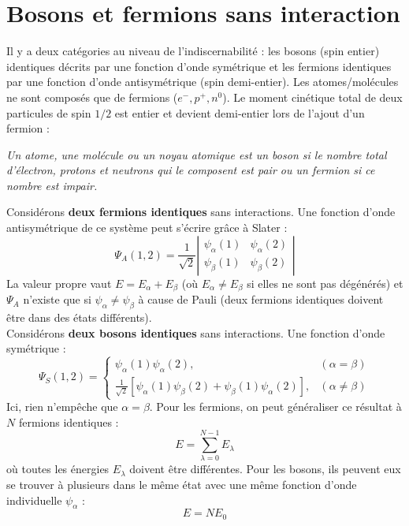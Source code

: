\documentclass[british,french,11pt, a4paper, openany]{book}
\begin{document}
\section{Bosons et fermions sans interaction}
Il y a deux catégories au niveau de l'indiscernabilité : les bosons (spin entier) identiques décrits par 
une fonction d'onde symétrique et les fermions identiques par une fonction d'onde antisymétrique (spin 
demi-entier). Les atomes/molécules ne sont composés que de fermions ($e^-,p^+,n^0$). Le moment cinétique
total de deux particules de spin $1/2$ est entier et devient demi-entier lors de l'ajout d'un fermion :
\begin{center}
	\textit{Un atome, une molécule ou un noyau atomique est un boson si le nombre total d'électron, protons 
		et neutrons qui le composent est pair ou un fermion si ce nombre est impair.}
\end{center}
Considérons \textbf{deux fermions identiques} sans interactions. Une fonction d'onde antisymétrique de
ce système peut s'écrire grâce à Slater :
\begin{equation}
	\Psi_A(1,2) = \frac{1}{\sqrt{2}}\left|\begin{array}{cc}
		\psi_\alpha(1) & \psi_\alpha(2)\\
		\psi_\beta(1) & \psi_\beta(2)
	\end{array}\right|
\end{equation}
La valeur propre vaut $E = E_\alpha + E_\beta$ (où $E_\alpha \neq E_\beta$ si elles ne sont pas dégénérés) 
et $\Psi_A$ n'existe que si $\psi_\alpha\neq\psi_\beta$ à cause de Pauli (deux fermions identiques doivent 
être dans des états différents).\\
Considérons \textbf{deux bosons identiques} sans interactions. Une fonction d'onde symétrique :
\begin{equation}
	\Psi_S(1,2) = \left\{\begin{array}{ll}
		\psi_\alpha(1)\psi_\alpha(2), & (\alpha=\beta)\\
		\frac{1}{\sqrt{2}}[\psi_\alpha(1)\psi_\beta(2) + \psi_\beta(1)\psi_\alpha(2)], & (\alpha\neq\beta)
	\end{array}\right.
\end{equation}
Ici, rien n'empêche que $\alpha = \beta$. Pour les fermions, on peut généraliser ce résultat à $N$ fermions 
identiques :
\begin{equation}
	E = \sum_{\lambda=0}^{N-1} E_\lambda
\end{equation}
où toutes les énergies $E_\lambda$ doivent être différentes. Pour les bosons, ils peuvent eux se trouver
à plusieurs dans le même état avec une même fonction d'onde individuelle $\psi_\alpha$ :
\begin{equation}
	E = NE_0
\end{equation}
\end{document}
